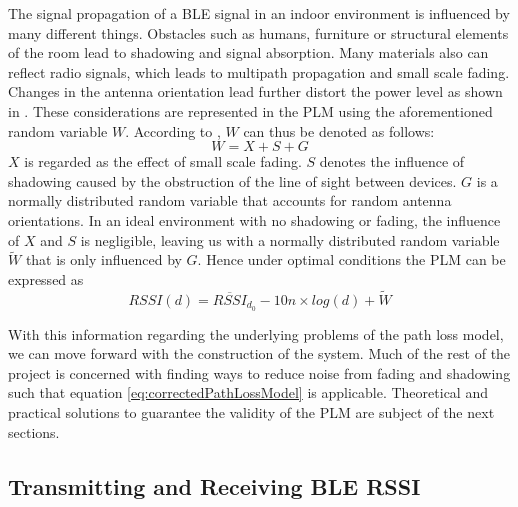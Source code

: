 \documentclass[a4paper, oneside]{ipsreport}
\begin{document}
The signal propagation of a BLE signal in an indoor environment is influenced by many different things. Obstacles such as humans, furniture or structural elements of the room lead to shadowing and signal absorption. Many materials also can reflect radio signals, which leads to multipath propagation and small scale fading. Changes in the antenna orientation lead further distort the power level as shown in \cite{AntennaOrientationRssi}. These considerations are represented in the PLM using the aforementioned random variable $W$. According to \cite{AntennaDiversity}, $W$ can thus be denoted as follows:
\begin{equation} \label{eq:2}
	W = X + S + G
\end{equation}
$X$ is regarded as the effect of small scale fading. $S$ denotes the influence of shadowing caused by the obstruction of the line of sight between devices. $G$ is a normally distributed random variable that accounts for random antenna orientations. In an ideal environment with no shadowing or fading, the influence of $X$ and $S$ is negligible, leaving us with a normally distributed random variable $\tilde{W}$ that is only influenced by $G$. Hence under optimal conditions the PLM can be expressed as
\begin{equation} \label{eq:correctedPathLossModel}
	RSSI(d) = \overline{RSSI}_{d_0} - 10n \times log(d) + \tilde{W}
\end{equation}

With this information regarding the underlying problems of the path loss model, we can move forward with the construction of the system. Much of the rest of the project is concerned with finding ways to reduce noise from fading and shadowing such that equation \ref{eq:correctedPathLossModel} is applicable. Theoretical and practical solutions to guarantee the validity of the PLM are subject of the next sections.

\subsection{Transmitting and Receiving BLE RSSI}
\end{document}
